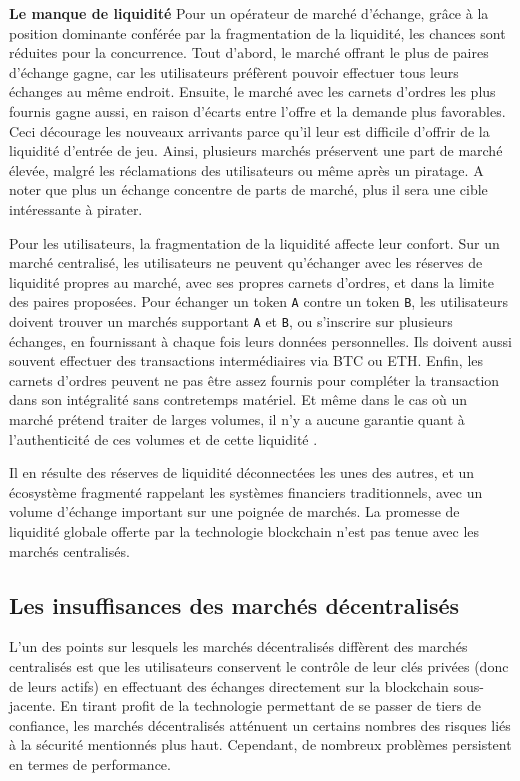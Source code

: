 \documentclass[UTF8,nofonts]{article}
\begin{document}
\begin{multicols}{2}
\textbf{Le manque de liquidité} Pour un opérateur de marché d'échange, grâce à  la position dominante conférée par la fragmentation de la liquidité, les chances sont réduites pour la concurrence. Tout d'abord, le marché offrant le plus de paires d'échange gagne, car les utilisateurs préfèrent pouvoir effectuer tous leurs échanges au même endroit. Ensuite, le marché avec les carnets d'ordres les plus fournis gagne aussi, en raison d'écarts entre l'offre et la demande plus favorables. Ceci décourage les nouveaux arrivants parce qu'il leur est difficile d'offrir de la liquidité d'entrée de jeu. Ainsi, plusieurs marchés préservent une part de marché élevée, malgré les réclamations des utilisateurs ou même après un piratage. A noter que plus un échange concentre de parts de marché, plus il sera une cible intéressante à pirater.

Pour les utilisateurs, la fragmentation de la liquidité affecte leur confort. Sur un marché centralisé, les utilisateurs ne peuvent qu'échanger avec les réserves de liquidité propres au marché, avec ses propres carnets d'ordres, et dans la limite des paires proposées. Pour échanger un token \verb|A| contre un token \verb|B|, les utilisateurs doivent trouver un marchés supportant \verb|A| et \verb|B|, ou s'inscrire sur plusieurs échanges, en fournissant à chaque fois leurs données personnelles. Ils doivent aussi souvent effectuer des transactions intermédiaires via BTC ou ETH. Enfin, les carnets d'ordres peuvent ne pas être assez fournis pour compléter la transaction dans son intégralité sans contretemps matériel. Et même dans le cas où un marché prétend traiter de larges volumes, il n'y a aucune garantie quant à l'authenticité de ces volumes et de cette liquidité \cite{fakevolume}.

Il en résulte des réserves de liquidité déconnectées les unes des autres, et un écosystème fragmenté rappelant les systèmes financiers traditionnels, avec un volume d'échange important sur une poignée de marchés. La promesse de liquidité globale offerte par la technologie blockchain n'est pas tenue avec les marchés centralisés.

\subsection{Les insuffisances des marchés décentralisés}
L'un des points sur lesquels les marchés décentralisés diffèrent des marchés centralisés est que les utilisateurs conservent le contrôle de leur clés privées (donc de leurs actifs) en effectuant des échanges directement sur la blockchain sous-jacente. En tirant profit de la technologie permettant de se passer de tiers de confiance, les marchés décentralisés atténuent un certains nombres des risques liés à la sécurité mentionnés plus haut. Cependant, de nombreux problèmes persistent en termes de performance. 



\end{multicols}
\end{document}
